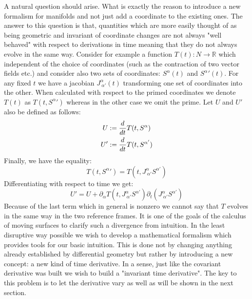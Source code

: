 \documentclass[../main.tex]{subfiles}
\begin{document}
        A natural question should arise. What is exactly the reason to introduce a new formalism for manifolds and not just add a coordinate to the existing ones. The answer to this question is that, quantities which are more easily thought of as being geometric and invariant of coordinate changes are not always "well behaved" with respect to derivations in time meaning that they do not always evolve in the same way. Consider for example a function $T(t):N\to \mathbb{R}$ which independent of the choice of coordinates (such as the contraction of two vector fields etc.) and consider also two sets of coordinates: $S^\alpha(t)$ and $S^\alpha'(t)$. For any fixed $t$ we have a jacobian $J^\alpha_{\ \alpha'}(t)$ transforming one set of coordinates into the other. When calculated with respect to the primed coordinates we denote $T(t)$ as $T(t,S^\alpha')$ whereas in the other case we omit the prime. Let $U$ and $U'$ also be defined as follows:
        \begin{gather}
            U:=\dfrac{d^{}}{dt^{}}T(t,S^\alpha)   \\
            U':=\dfrac{d^{}}{dt^{}}T(t,S^{\alpha'})
        \end{gather}
        Finally, we have the equality:
        \begin{equation}
            T(t,S^{\alpha}')=T(t,J^\alpha_{\ \alpha'}S^{\alpha'})
        \end{equation}
        Differentiating with respect to time we get:
        \begin{equation}
            U'=U+\partial_\alpha T(t,J^\alpha_{\ \alpha'}S^{\alpha'})\partial_t(J^\alpha_{\ \alpha'}S^{\alpha'})
        \end{equation}
        Because of the last term which in general is nonzero we cannot say that $T$ evolves in the same way in the two reference frames. It is one of the goals of the calculus of moving surfaces to clarify such a divergence from intuition. In the least disruptive way possible we wish to develop a mathematical formalism which provides tools for our basic intuition. This is done not by changing anything already established by differential geometry but rather by introducing a new concept: a new kind of time derivative. In a sense, just like the covariant derivative was built we wish to build a "invariant time derivative". The key to this problem is to let the derivative vary as well as will be shown in the next section.
\end{document}
